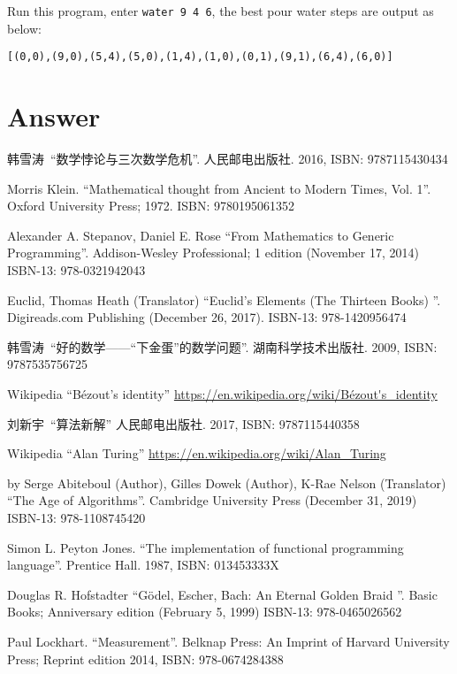 \documentclass[b5paper]{article}
\begin{document}
Run this program, enter \texttt{water 9 4 6}, the best pour water steps
are output as below:

\begin{verbatim}
[(0,0),(9,0),(5,4),(5,0),(1,4),(1,0),(0,1),(9,1),(6,4),(6,0)]
\end{verbatim}

\ifx\wholebook\relax \else
\section{Answer}
\shipoutAnswer

\begin{thebibliography}{99}

韩雪涛\ ``数学悖论与三次数学危机''. 人民邮电出版社. 2016, ISBN: 9787115430434

Morris Klein. ``Mathematical thought from Ancient to Modern Times, Vol. 1''. Oxford University Press; 1972. ISBN: 9780195061352

Alexander A. Stepanov, Daniel E. Rose ``From Mathematics to Generic Programming''. Addison-Wesley Professional; 1 edition (November 17, 2014) ISBN-13: 978-0321942043

Euclid, Thomas Heath (Translator) ``Euclid's Elements (The Thirteen Books) ''. Digireads.com Publishing (December 26, 2017). ISBN-13: 978-1420956474

韩雪涛\ ``好的数学——“下金蛋”的数学问题''. 湖南科学技术出版社. 2009, ISBN: 9787535756725

Wikipedia ``Bézout's identity'' \url{https://en.wikipedia.org/wiki/Bézout's_identity}

刘新宇\ ``算法新解'' 人民邮电出版社. 2017, ISBN: 9787115440358

Wikipedia ``Alan Turing'' \url{https://en.wikipedia.org/wiki/Alan_Turing}

by Serge Abiteboul (Author), Gilles Dowek (Author), K-Rae Nelson (Translator) ``The Age of Algorithms''. Cambridge University Press (December 31, 2019) ISBN-13: 978-1108745420

Simon L. Peyton Jones. ``The implementation of functional programming language''. Prentice Hall. 1987, ISBN: 013453333X

Douglas R. Hofstadter ``Gödel, Escher, Bach: An Eternal Golden Braid ''. Basic Books; Anniversary edition (February 5, 1999) ISBN-13: 978-0465026562

Paul Lockhart. ``Measurement''. Belknap Press: An Imprint of Harvard University Press; Reprint edition 2014, ISBN: 978-0674284388

\end{thebibliography}

\expandafter\enddocument

\fi
\end{document}
